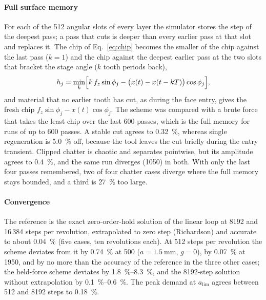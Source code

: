 \paragraph{Full surface memory}
For each of the 512 angular slots of every layer the simulator stores the step of the deepest pass; a pass that cuts is deeper than every earlier pass at that slot and replaces it. The chip of Eq.~\eqref{eq:chip} becomes the smaller of the chip against the last pass ($k=1$) and the chip against the deepest earlier pass at the two slots that bracket the stage angle ($k$ tooth periods back),
\begin{equation}\label{eq:surf}
  h_j=\min_{k}\Bigl[k\,f_z\sin\phi_j-\bigl(x(t)-x(t-kT)\bigr)\cos\phi_j\Bigr],
\end{equation}
and material that no earlier tooth has cut, as during the face entry, gives the fresh chip $f_z\sin\phi_j-x(t)\cos\phi_j$. The scheme was compared with a brute force that takes the least chip over the last 600 passes, which is the full memory for runs of up to 600 passes. A stable cut agrees to \SI{0.32}{\percent}, whereas single regeneration is \SI{5.0}{\percent} off, because the tool leaves the cut briefly during the entry transient. Clipped chatter is chaotic and separates pointwise, but its amplitude agrees to \SI{0.4}{\percent}, and the same run diverges (\SI{1050}{\rpm}) in both. With only the last four passes remembered, two of four chatter cases diverge where the full memory stays bounded, and a third is \SI{27}{\percent} too large.

\paragraph{Convergence}
The reference is the exact zero-order-hold solution of the linear loop at 8192 and 16\,384 steps per revolution, extrapolated to zero step (Richardson) and accurate to about \SI{0.04}{\percent} (five cases, ten revolutions each). At 512 steps per revolution the scheme deviates from it by \SI{0.74}{\percent} at \SI{500}{\rpm} ($a=\SI{1.5}{\milli\metre}$, $g=0$), by \SI{0.07}{\percent} at \SI{1950}{\rpm}, and by no more than the accuracy of the reference in the three other cases; the held-force scheme deviates by \SIrange{1.8}{8.3}{\percent}, and the 8192-step solution without extrapolation by \SIrange{0.1}{0.6}{\percent}. The peak demand at $a_{\lim}$ agrees between 512 and 8192 steps to \SI{0.18}{\percent}.

